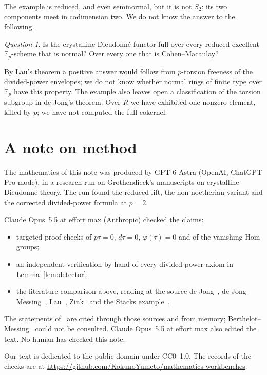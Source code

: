 \documentclass[11pt]{amsart}
\newcommand{\recordurl}{https://github.com/KokunoYumeto/mathematics-workbenches}
\theoremstyle{remark}
\newtheorem{question}[theorem]{Question}
\newcommand{\Fp}{\mathbb{F}_p}
\begin{document}
The example is reduced, and even seminormal, but it is not $S_2$: its two components meet in codimension two. We do
not know the answer to the following.

\begin{question}
Is the crystalline Dieudonn\'e functor full over every reduced excellent $\Fp$-scheme that is normal? Over every one
that is Cohen--Macaulay?
\end{question}

By Lau's theorem a positive answer would follow from $p$-torsion freeness of the divided-power envelopes; we do not know
whether normal rings of finite type over $\Fp$ have this property. The example also leaves open a classification of the
torsion subgroup in de Jong's theorem. Over $R$ we have exhibited one nonzero element, killed by $p$; we have not
computed the full cokernel.

\section*{A note on method}
The mathematics of this note was produced by GPT-6 Astra (OpenAI, ChatGPT Pro mode), in a research run on
Grothendieck's manuscripts on crystalline Dieudonn\'e theory. The run found the reduced lift, the non-noetherian
variant and the corrected divided-power formula at $p=2$.

Claude Opus~5.5 at effort max (Anthropic) checked the claims:
\begin{itemize}
\item targeted proof checks of $p\tau=0$, $d\tau=0$, $\varphi(\tau)=0$ and of the vanishing Hom groups;
\item an independent verification by hand of every divided-power axiom in Lemma~\ref{lem:detector};
\item the literature comparison above, reading at the source de Jong~\cite{dJ95,dJICM}, de Jong--Messing~\cite{dJM},
  Lau~\cite{Lau}, Zink~\cite{Zink} and the Stacks example~\cite{Stacks}.
\end{itemize}
The statements of~\cite{BBM,BM,ALB} are cited through those sources and from memory; Berthelot--Messing~\cite{BM} could
not be consulted. Claude Opus~5.5 at effort max also edited the text. No human has checked this note.

Our text is dedicated to the public domain under CC0~1.0. The records of the checks are at \url{\recordurl}.
\end{document}
